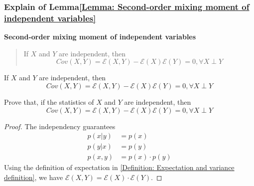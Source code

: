 \documentclass[../concepts.tex]{subfiles}
\begin{document}
\subsubsection{Explain of Lemma\ref{Lemma: Second-order mixing moment of independent variables}}
\textbf{Second-order mixing moment of independent variables}
\begin{quote}
    If $X$ and $Y$ are independent, then
    \begin{equation*}
        Cov(X, Y) =
        \mathcal{E}(X, Y) - \mathcal{E}(X) \mathcal{E}(Y) = 0,
        \forall X \perp Y
    \end{equation*}
\end{quote}


If $X$ and $Y$ are independent, then
\begin{equation*}
    Cov(X, Y) =
    \mathcal{E}(X, Y) - \mathcal{E}(X) \mathcal{E}(Y) = 0,
    \forall X \perp Y
\end{equation*}


Prove that, if the statistics of $X$ and $Y$ are independent, then
\begin{equation*}
    Cov(X, Y) =
    \mathcal{E}(X, Y) - \mathcal{E}(X) \mathcal{E}(Y) = 0,
    \forall X \perp Y
\end{equation*}

\begin{proof}
    The independency guarantees
    \begin{align*}
        p(x|y)  & = p(x)            \\
        p(y|x)  & = p(y)            \\
        p(x, y) & = p(x) \cdot p(y)
    \end{align*}
    Using the definition of expectation in \eqref{Definition: Expectation and variance definition},
    we have $\mathcal{E}(X, Y) = \mathcal{E}(X) \cdot \mathcal{E}(Y)$.
\end{proof}
\end{document}
